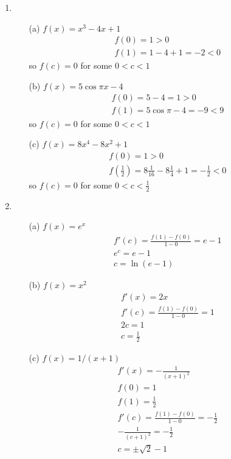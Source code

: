 \documentclass[UTF8]{ctexart}
\begin{document}
\begin{enumerate}
\item \begin{itemize}
\item[(a)] $f(x) = x^3 - 4x + 1$
\begin{gather*}
f(0) = 1 > 0\\
f(1) = 1 - 4 + 1 = -2 < 0
\end{gather*}
so $f(c) = 0$ for some $0 < c < 1$

\item[(b)] $f(x) = 5\cos \pi x - 4$
\begin{gather*}
f(0) = 5 - 4= 1 > 0 \\
f(1) = 5\cos \pi - 4 = -9 < 9
\end{gather*}
so $f(c) = 0$ for some $0 < c < 1$

\item[(c)] $f(x) = 8x^4 - 8x^2 + 1$
\begin{gather*}
f(0) = 1 > 0 \\
f(\frac{1}{2}) = 8\frac{1}{16} - 8\frac{1}{4} + 1 = -\frac{1}{2} < 0
\end{gather*}
so $f(c) = 0$ for some $0 < c < \frac{1}{2}$
\end{itemize}

\item \begin{itemize}
\item[(a)] $f(x) = e^x$ \\
\begin{gather*}
	f'(c) = \frac{f(1) - f(0)}{1 - 0} = e - 1 \\
	e^c = e - 1 \\
	c = \ln(e-1)
\end{gather*}

\item[(b)] $f(x) = x^2$ \\
\begin{gather*}
f'(x) = 2x \\
f'(c) = \frac{f(1) - f(0)}{1 - 0} = 1 \\
2c = 1 \\
c = \frac{1}{2}
\end{gather*}

\item[(c)] $f(x) = 1/(x + 1)$ \\
\begin{gather*}
f'(x) = -\frac{1}{(x + 1)^2} \\
f(0) = 1 \\
f(1) = \frac{1}{2} \\
f'(c) = \frac{f(1) - f(0)}{1 - 0} = -\frac{1}{2} \\
-\frac{1}{(c + 1)^2} = -\frac{1}{2} \\
c = \pm \sqrt 2 - 1
\end{gather*}
\end{itemize}


\end{enumerate}
\end{document}
